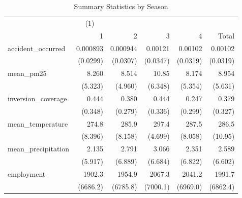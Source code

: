 \begin{table}[htbp]\centering
\caption{Summary Statistics by Season\label{sumstats\_season}}
\begin{tabular}{l*{5}{D{.}{.}{-1}}}
\toprule
                    &&            &            &            &            \\
                    &           1&           2&           3&           4&       Total\\
\midrule
accident\_occurred   &    0.000893&    0.000944&     0.00121&     0.00102&     0.00102\\
                    &    (0.0299)&    (0.0307)&    (0.0347)&    (0.0319)&    (0.0319)\\
\addlinespace
mean\_pm25           &       8.260&       8.514&       10.85&       8.174&       8.954\\
                    &     (5.323)&     (4.960)&     (6.348)&     (5.354)&     (5.631)\\
\addlinespace
inversion\_coverage  &       0.444&       0.380&       0.444&       0.247&       0.379\\
                    &     (0.348)&     (0.279)&     (0.336)&     (0.299)&     (0.327)\\
\addlinespace
mean\_temperature    &       274.8&       285.9&       297.4&       287.5&       286.5\\
                    &     (8.396)&     (8.158)&     (4.699)&     (8.058)&     (10.95)\\
\addlinespace
mean\_precipitation  &       2.135&       2.791&       3.066&       2.351&       2.589\\
                    &     (5.917)&     (6.889)&     (6.684)&     (6.822)&     (6.602)\\
\addlinespace
employment          &      1902.3&      1954.9&      2067.3&      2041.2&      1991.7\\
                    &    (6686.2)&    (6785.8)&    (7000.1)&    (6969.0)&    (6862.4)\\
\bottomrule
\end{tabular}
\end{table}
